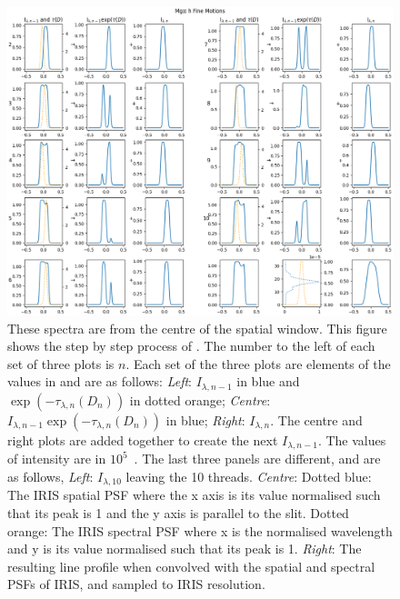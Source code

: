 \begin{figure}
    \includegraphics[width=\linewidth]{./03Modelling2D/figs/StanoPlots/slow/h.png}
    \caption[Slow Moving \mgii~h threads.]{These spectra are from the centre of the spatial window. This figure shows the step by step process of . The number to the left of each set of three plots is $n$. Each set of the three plots are elements of the values in  and are as follows: \textit{Left}: $I_{\lambda,n-1}$ in blue and $\exp\left(-\tau_{\lambda,n}(D_n)\right)$ in dotted orange; \textit{Centre}: $I_{\lambda,n-1}\exp\left(-\tau_{\lambda,n}(D_n)\right)$ in blue; \textit{Right}: $I_{\lambda,n}$. The centre and right plots are added together to create the next $I_{\lambda,n-1}$. The values of intensity are in $10^5$~\cgsint.
    The last three panels are different, and are as follows, \textit{Left}: $I_{\lambda,10}$ leaving the 10 threads. \textit{Centre}: Dotted blue: The IRIS spatial PSF where the x axis is its value normalised such that its peak is 1 and the y axis is parallel to the slit. Dotted orange: The IRIS spectral PSF where x is the normalised wavelength and y is its value normalised such that its peak is 1. \textit{Right}: The resulting line profile when convolved with the spatial and spectral PSFs of IRIS, and sampled to IRIS resolution.}
    \label{slowmgiih}
\end{figure}
